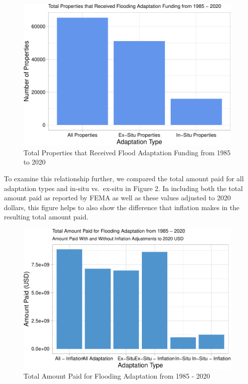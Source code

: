 \documentclass[
  12pt,
]{article}
\begin{document}
\begin{figure}
\centering
\includegraphics{finalreport_files/figure-latex/unnamed-chunk-5-1.pdf}
\caption{Total Properties that Received Flood Adaptation Funding from
1985 to 2020}
\end{figure}

To examine this relationship further, we compared the total amount paid
for all adaptation types and in-situ vs.~ex-situ in Figure 2. In
including both the total amount paid as reported by FEMA as well as
these values adjusted to 2020 dollars, this figure helps to also show
the difference that inflation makes in the resulting total amount paid.
\newline

\begin{figure}
\centering
\includegraphics{finalreport_files/figure-latex/unnamed-chunk-6-1.pdf}
\caption{Total Amount Paid for Flooding Adaptation from 1985 - 2020}
\end{figure}
\end{document}
